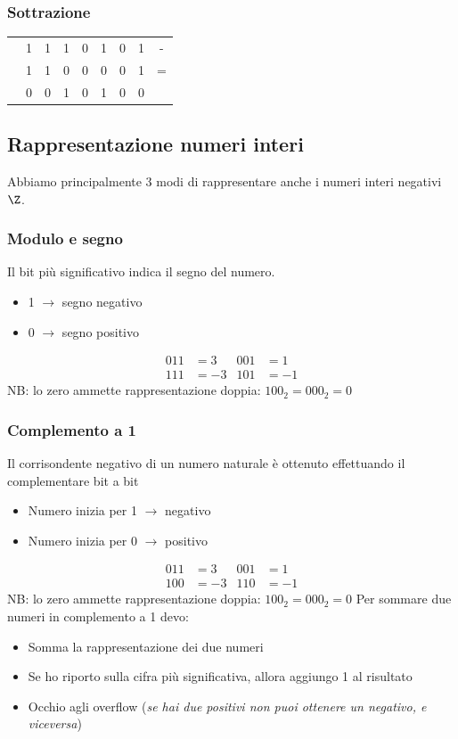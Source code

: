 \subsubsection*{Sottrazione}
\begin{center}
	\begin{tabular}{c c c c c c c c | c}
		 & 1 & 1 & 1 & 0 & 1 & 0 & 1 & - \\
		 & 1 & 1 & 0 & 0 & 0 & 0 & 1 & = \\
		\hline
		 & 0 & 0 & 1 & 0 & 1 & 0 & 0 &   \\
	\end{tabular}
\end{center}
\subsection{Rappresentazione numeri interi}
Abbiamo principalmente 3 modi di rappresentare anche i numeri interi negativi $ \Z  $.
\subsubsection*{Modulo e segno}
Il bit più significativo indica il segno del numero.
\begin{itemize}
	\item 1 $ \rightarrow  $ segno negativo
	\item 0 $ \rightarrow  $ segno positivo
\end{itemize}
\begin{align*}
	011 & =3   & 001 & = 1  \\
	111 & = -3 & 101 & = -1
\end{align*}
NB: lo zero ammette rappresentazione doppia: $ 100_2 = 000_2 = 0 $
\subsubsection*{Complemento a 1}
Il corrisondente negativo di un numero naturale è ottenuto effettuando il complementare bit a bit
\begin{itemize}
	\item Numero inizia per 1 $ \rightarrow  $ negativo
	\item Numero inizia per 0 $ \rightarrow  $ positivo
\end{itemize}
\begin{align*}
	011 & =3   & 001 & = 1  \\
	100 & = -3 & 110 & = -1
\end{align*}
NB: lo zero ammette rappresentazione doppia: $ 100_2 = 000_2 = 0 $
\vskip3mm
Per sommare due numeri in complemento a 1 devo:
\begin{itemize}
	\item Somma la rappresentazione dei due numeri
	\item Se ho riporto sulla cifra più significativa, allora aggiungo 1 al risultato
	\item Occhio agli overflow (\textit{se hai due positivi non puoi ottenere un negativo, e viceversa})
\end{itemize}
